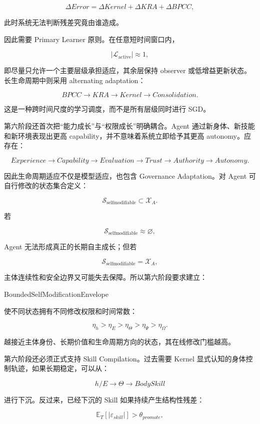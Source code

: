 \[
\Delta Error
=
\Delta Kernel
+
\Delta KRA
+
\Delta BPCC,
\]

此时系统无法判断残差究竟由谁造成。

因此需要 Primary Learner 原则。在任意短时间窗口内，

\[
|\mathcal L_{\mathrm{active}}|
\approx 1,
\]

即尽量只允许一个主要层级承担适应，其余层保持 observer 或低增益更新状态。长生命周期中则采用 alternating adaptation：

\[
BPCC
\rightarrow
KRA
\rightarrow
Kernel
\rightarrow
Consolidation.
\]

这是一种跨时间尺度的学习调度，而不是所有层级同时进行 SGD。

第六阶段还首次把“能力成长”与“权限成长”明确耦合。Agent 通过新身体、新技能和新环境表现出更高 capability，并不意味着系统立即给予其更高 autonomy。应存在：

\[
Experience
\rightarrow
Capability
\rightarrow
Evaluation
\rightarrow
Trust
\rightarrow
Authority
\rightarrow
Autonomy.
\]

因此生命周期适应不仅是模型适应，也包含 Governance Adaptation。对 Agent 可自行修改的状态集合定义：

\[
\mathcal S_{\mathrm{selfmodifiable}}
\subset
\mathcal X_A.
\]

若

\[
\mathcal S_{\mathrm{selfmodifiable}}
\approx
\varnothing,
\]

Agent 无法形成真正的长期自主成长；但若

\[
\mathcal S_{\mathrm{selfmodifiable}}
=
\mathcal X_A,
\]

主体连续性和安全边界又可能失去保障。所以第六阶段要求建立：

\begin{statementbox}
BoundedSelfModificationEnvelope
\end{statementbox}

使不同状态拥有不同修改权限和时间常数：

\[
\eta_h
>
\eta_E
>
\eta_\Theta
>
\eta_\Psi
>
\eta_\Omega.
\]

越接近主体身份、长期价值和生命周期方向的状态，其在线修改门槛越高。

第六阶段还必须正式支持 Skill Compilation。过去需要 Kernel 显式认知的身体控制轨迹，如果长期稳定，可以从：

\[
h/E
\rightarrow
\Theta
\rightarrow
BodySkill
\]

进行下沉。反过来，已经下沉的 Skill 如果持续产生结构性残差：

\[
\mathbb E_T[|\varepsilon_{skill}|]
>
\theta_{promote},
\]

